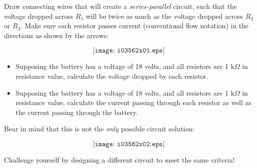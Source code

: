 

Draw connecting wires that will create a {\it series-parallel} circuit, such that the voltage dropped across $R_1$ will be twice as much as the voltage dropped across $R_2$ or $R_3$.  Make sure each resistor passes current (conventional flow notation) in the directions as shown by the arrows:

$$\texttt{[image: i03562x01.eps]}$$

\begin{itemize}
\item{} Supposing the battery has a voltage of 18 volts, and all resistors are 1 k$\Omega$ in resistance value, calculate the voltage dropped by each resistor.
\item{} Supposing the battery has a voltage of 18 volts, and all resistors are 1 k$\Omega$ in resistance value, calculate the current passing through each resistor as well as the current passing through the battery.
\end{itemize}







Bear in mind that this is not the {\it only} possible circuit solution:

$$\texttt{[image: i03562x02.eps]}$$

Challenge yourself by designing a different circuit to meet the same criteria! 











